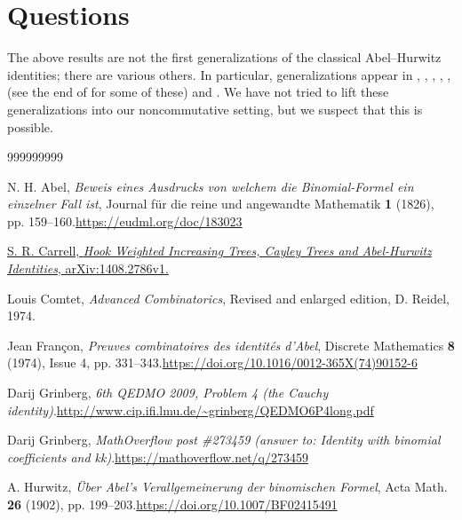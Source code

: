 \documentclass[numbers=enddot,12pt,final,onecolumn,notitlepage]{scrartcl}%
\theoremstyle{definition}
\begin{document}
\section{Questions}

The above results are not the first generalizations of the classical
Abel--Hurwitz identities; there are various others. In particular,
generalizations appear in \cite{Strehl92}, \cite[Theorem 1.2]{Carrel14},
\cite{Johns96}, \cite{Kalai79}, \cite{Pitman02}, \cite[\S 1.6]{Riorda68} (see
the end of \cite{qedmo09} for some of these) and \cite{KelPos}. We have not
tried to lift these generalizations into our noncommutative setting, but we
suspect that this is possible.

\begin{thebibliography}{999999999}                                                                                        %


N. H. Abel, \textit{Beweis eines Ausdrucks von welchem
die Binomial-Formel ein einzelner Fall ist}, Journal f\"{u}r die reine und
angewandte Mathematik \textbf{1} (1826), pp. 159--160.\newline\url{https://eudml.org/doc/183023}

\href{https://arxiv.org/abs/1408.2786v1}{S. R.
Carrell, \textit{Hook Weighted Increasing Trees, Cayley Trees and Abel-Hurwitz
Identities}, arXiv:1408.2786v1.}

Louis Comtet, \textit{Advanced Combinatorics},
Revised and enlarged edition, D. Reidel, 1974.

Jean Fran\c{c}on, \textit{Preuves combinatoires
des identit\'{e}s d'Abel}, Discrete Mathematics \textbf{8} (1974), Issue 4,
pp. 331--343.\newline\url{https://doi.org/10.1016/0012-365X(74)90152-6}

Darij Grinberg, \textit{6th QEDMO 2009, Problem 4
(the Cauchy identity)}.\newline\url{http://www.cip.ifi.lmu.de/~grinberg/QEDMO6P4long.pdf}

Darij Grinberg, \textit{MathOverflow post \#273459
(answer to: Identity with binomial coefficients and kk)}.\newline\url{https://mathoverflow.net/q/273459}

A. Hurwitz, \textit{\"{U}ber Abel's
Verallgemeinerung der binomischen Formel}, Acta Math. \textbf{26} (1902), pp.
199--203.\newline\url{https://doi.org/10.1007/BF02415491}


\end{thebibliography}
\end{document}
